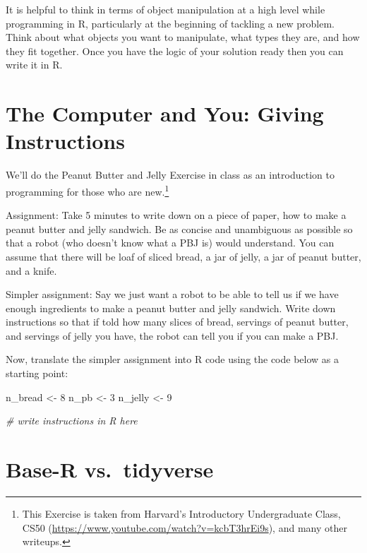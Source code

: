 \documentclass[]{book}
\newenvironment{Shaded}{\begin{snugshade}}{\end{snugshade}}
\newcommand{\CommentTok}[1]{\textcolor[rgb]{0.56,0.35,0.01}{\textit{#1}}}
\newcommand{\DecValTok}[1]{\textcolor[rgb]{0.00,0.00,0.81}{#1}}
\newcommand{\NormalTok}[1]{#1}
\newcommand{\StringTok}[1]{\textcolor[rgb]{0.31,0.60,0.02}{#1}}
\let\rmarkdownfootnote\footnote%
\def\footnote{\protect\rmarkdownfootnote}
\theoremstyle{definition}
\theoremstyle{definition}
\theoremstyle{definition}
\theoremstyle{remark}
\begin{document}
It is helpful to think in terms of object manipulation at a high level while programming in R, particularly at the beginning of tackling a new problem. Think about what objects you want to manipulate, what types they are, and how they fit together. Once you have the logic of your solution ready then you can write it in R.

\hypertarget{the-computer-and-you-giving-instructions}{%
\section{The Computer and You: Giving Instructions}\label{the-computer-and-you-giving-instructions}}

We'll do the Peanut Butter and Jelly Exercise in class as an introduction to programming for those who are new.\footnote{This Exercise is taken from Harvard's Introductory Undergraduate Class, CS50 (\url{https://www.youtube.com/watch?v=kcbT3hrEi9s}), and many other writeups.}

Assignment: Take 5 minutes to write down on a piece of paper, how to make a peanut butter and jelly sandwich. Be as concise and unambiguous as possible so that a robot (who doesn't know what a PBJ is) would understand. You can assume that there will be loaf of sliced bread, a jar of jelly, a jar of peanut butter, and a knife.

Simpler assignment: Say we just want a robot to be able to tell us if we have enough ingredients to make a peanut butter and jelly sandwich. Write down instructions so that if told how many slices of bread, servings of peanut butter, and servings of jelly you have, the robot can tell you if you can make a PBJ.

Now, translate the simpler assignment into R code using the code below as a starting point:

\begin{Shaded}
\begin{Highlighting}[]
\NormalTok{n_bread <-}\StringTok{ }\DecValTok{8}
\NormalTok{n_pb <-}\StringTok{ }\DecValTok{3}
\NormalTok{n_jelly <-}\StringTok{ }\DecValTok{9}

\CommentTok{# write instructions in R here}
\end{Highlighting}
\end{Shaded}

\hypertarget{base-r-vs.tidyverse}{%
\section{Base-R vs.~tidyverse}\label{base-r-vs.tidyverse}}
\end{document}
